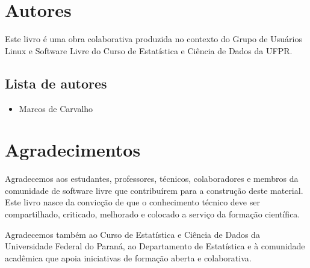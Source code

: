 \documentclass[12pt,openany]{book}
\begin{document}
\cleardoublepage
\chapter*{Autores}

Este livro é uma obra colaborativa produzida no contexto do Grupo de Usuários Linux e Software Livre do Curso de Estatística e Ciência de Dados da UFPR.

\section*{Lista de autores}




\begin{itemize}
    \item Marcos de Carvalho
\end{itemize}


\cleardoublepage
\chapter*{Agradecimentos}

Agradecemos aos estudantes, professores, técnicos, colaboradores e membros da comunidade de software livre que contribuírem para a construção deste material. Este livro nasce da convicção de que o conhecimento técnico deve ser compartilhado, criticado, melhorado e colocado a serviço da formação científica.

Agradecemos também ao Curso de Estatística e Ciência de Dados da Universidade Federal do Paraná, ao Departamento de Estatística e à comunidade acadêmica que apoia iniciativas de formação aberta e colaborativa.
\end{document}
